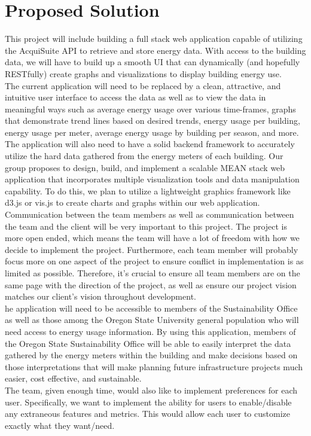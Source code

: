 \documentclass[onecolumn, draftclsnofoot,10pt, compsoc]{IEEEtran}
\begin{document}
    \section{Proposed Solution}
    This project will include building a full stack web application capable of utilizing the AcquiSuite API to retrieve and store energy data. With access to the building data, we will have to build up a smooth UI that can dynamically (and hopefully RESTfully) create graphs and visualizations to display building energy use.\\
    \indent The current application will need to be replaced by a clean, attractive, and intuitive user interface to access the data as well as to view the data in meaningful ways such as average energy usage over various time-frames, graphs that demonstrate trend lines based on desired trends, energy usage per building, energy usage per meter, average energy usage by building per season, and more. The application will also need to have a solid backend framework to accurately utilize the hard data gathered from the energy meters of each building. Our group proposes to design, build, and implement a scalable MEAN stack web application that incorporates multiple visualization tools and data manipulation capability. To do this, we plan to utilize a lightweight graphics framework like d3.js or vis.js to create charts and graphs within our web application.\\
    \indent Communication between the team members as well as communication between the team and the client will be very important to this project. The project is more open ended, which means the team will have a lot of freedom with how we decide to implement the project. Furthermore, each team member will probably focus more on one aspect of the project to ensure conflict in implementation is as limited as possible.  Therefore, it’s crucial to ensure all team members are on the same page with the direction of the project, as well as ensure our project vision matches our client's vision throughout development.\\    
    \indent he application will need to be accessible to members of the Sustainability Office as well as those among the Oregon State University general population who will need access to energy usage information. By using this application, members of the Oregon State Sustainability Office will be able to easily interpret the data gathered by the energy meters within the building and make decisions based on those interpretations that will make planning future infrastructure projects much easier, cost effective, and sustainable.\\
    \indent The team, given enough time, would also like to implement preferences for each user. Specifically, we want to implement the ability for users to enable/disable any extraneous features and metrics. This would allow each user to customize exactly what they want/need.
    \newpage
\end{document}
